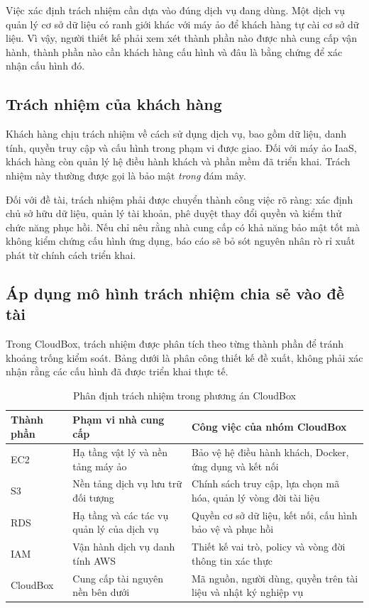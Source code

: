 Việc xác định trách nhiệm cần dựa vào đúng dịch vụ đang dùng. Một dịch vụ quản lý cơ sở dữ liệu có ranh giới khác với máy ảo để khách hàng tự cài cơ sở dữ liệu. Vì vậy, người thiết kế phải xem xét thành phần nào được nhà cung cấp vận hành, thành phần nào cần khách hàng cấu hình và đâu là bằng chứng để xác nhận cấu hình đó.

\subsection{Trách nhiệm của khách hàng}
Khách hàng chịu trách nhiệm về cách sử dụng dịch vụ, bao gồm dữ liệu, danh tính, quyền truy cập và cấu hình trong phạm vi được giao. Đối với máy ảo IaaS, khách hàng còn quản lý hệ điều hành khách và phần mềm đã triển khai. Trách nhiệm này thường được gọi là bảo mật \textit{trong} đám mây.\cite{shared}

Đối với đề tài, trách nhiệm phải được chuyển thành công việc rõ ràng: xác định chủ sở hữu dữ liệu, quản lý tài khoản, phê duyệt thay đổi quyền và kiểm thử chức năng phục hồi. Nếu chỉ nêu rằng nhà cung cấp có khả năng bảo mật tốt mà không kiểm chứng cấu hình ứng dụng, báo cáo sẽ bỏ sót nguyên nhân rò rỉ xuất phát từ chính cách triển khai.

\subsection{Áp dụng mô hình trách nhiệm chia sẻ vào đề tài}
Trong CloudBox, trách nhiệm được phân tích theo từng thành phần để tránh khoảng trống kiểm soát. Bảng dưới là phân công thiết kế đề xuất, không phải xác nhận rằng các cấu hình đã được triển khai thực tế.

\begin{table}[htbp]
\centering\small
\caption{Phân định trách nhiệm trong phương án CloudBox}
\begin{tabularx}{\textwidth}{@{}>{\raggedright\arraybackslash}p{1.8cm}XX@{}}
\toprule
\textbf{Thành phần} & \textbf{Phạm vi nhà cung cấp} & \textbf{Công việc của nhóm CloudBox} \\
\midrule
EC2 & Hạ tầng vật lý và nền tảng máy ảo & Bảo vệ hệ điều hành khách, Docker, ứng dụng và kết nối \\
S3 & Nền tảng dịch vụ lưu trữ đối tượng & Chính sách truy cập, lựa chọn mã hóa, quản lý vòng đời tài liệu \\
RDS & Hạ tầng và các tác vụ quản lý của dịch vụ & Quyền cơ sở dữ liệu, kết nối, cấu hình bảo vệ và phục hồi \\
IAM & Vận hành dịch vụ danh tính AWS & Thiết kế vai trò, policy và vòng đời thông tin xác thực \\
CloudBox & Cung cấp tài nguyên nền bên dưới & Mã nguồn, người dùng, quyền trên tài liệu và nhật ký nghiệp vụ \\
\bottomrule
\end{tabularx}
\end{table}

